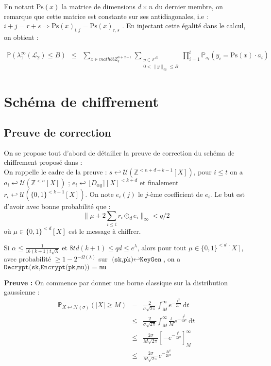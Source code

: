 \documentclass[11pt,a4paper]{article}
\begin{document}
En notant $\text{Ps}(x)$ la matrice de dimensions $d\times n$ du dernier membre, on remarque que cette matrice est constante sur ses antidiagonales, i.e : $ i+j=r+s \Rightarrow \text{Ps}(x)_{i,j}=\text{Ps}(x)_{r,s}$ . En injectant cette égalité dans le calcul, on obtient : 

\begin{eqnarray*}
\mathbb{P}(\lambda_1^\infty(\mathcal{L}_2) \leq B) &\leq& \sum_{x \in mathbb{Z}_q^{n+d-1}} \sum_{\substack{y \in \mathbb{Z}^{dt} \\ 0 < \|y\|_\infty \leq B}} \prod_{i=1}^t \mathbb{P}_{a_i}(y_i = \text{Ps}(x) \cdot  a_i)
\end{eqnarray*}






\section{Schéma de chiffrement}

\subsection{Preuve de correction}
On se propose tout d'abord de détailler la preuve de correction du schéma de chiffrement proposé dans \cite{mplwe} : \\

On rappelle le cadre de la preuve : $s \hookleftarrow \mathcal{U}(\mathbb{Z}^{<n+d+k-1}[X])$, pour $i\leq t$ on a $a_i \hookleftarrow \mathcal{U}(\mathbb{Z}^{<n}[X])$ ; $e_i \hookleftarrow \lfloor D_{\alpha q}\rceil[X]^{<k+d}$ et finalement $r_i \hookleftarrow \mathcal{U}(\{0,1\}^{<k+1}[X])$. On note $e_i(j)$ le $j$-ème coefficient de $e_i$. Le but est d'avoir avec bonne probabilité que : 
\[\|\mu + 2\sum_{i \leq t}r_i \odot_d e_i  \|_\infty < q/2 \] où $\mu \in \{0,1\}^{<d}[X]$ est le message à chiffrer. 
\begin{theorem}
Si $\alpha \leq \frac{1}{16(k+1)t\sqrt{\lambda}}$ et  $8td(k+1)\leq qd\leq e^\lambda$, alors pour tout $\mu \in \{0,1\}^{<d}[X]$, avec probabilité $\geq 1 - 2^{-\Omega(\lambda)}$ sur $\texttt{(sk,pk)}\hookleftarrow\texttt{KeyGen} $, on a $\texttt{Decrypt(sk,Encrypt(pk,mu)) = mu}$ 
\end{theorem}
\textbf{Preuve :}
On commence par donner une borne classique sur la distribution gaussienne : 
\begin{eqnarray*}
\mathbb{P}_{X \hookleftarrow \mathcal{N}(\sigma)}(|X| \geq M) &=& \frac{2}{\sigma \sqrt{2 \pi}} \int_{M}^\infty e^{-\frac{t^2}{2 \sigma^2}} \, \mathrm{d}t \\
&\leq &  \frac{2}{\sigma \sqrt{2 \pi}}\int_{M}^\infty \frac{t}{M} e^{-\frac{t^2}{2 \sigma^2}} \, \mathrm{d}t \\
& \leq & \frac{2\sigma}{M \sqrt{2 \pi}} [-e^{-\frac{t^2}{2 \sigma^2}}]_M^\infty \\
& \leq & \frac{2\sigma}{M \sqrt{2 \pi}} e^{-\frac{M^2}{2 \sigma^2}}
\end{eqnarray*}
\end{document}
